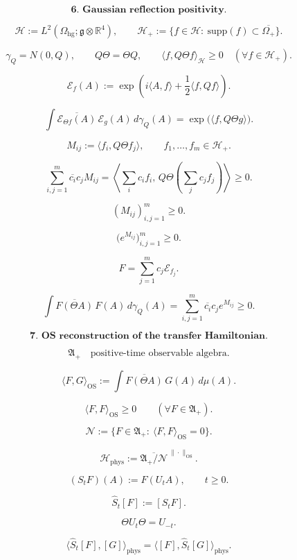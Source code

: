 \documentclass[11pt]{article}
\begin{document}
\bigskip

\[
\textbf{6. Gaussian reflection positivity.}
\]

\[
\mathcal H:=L^2(\Omega_{\mathrm{hg}};\mathfrak g\otimes\mathbb R^4),
\qquad
\mathcal H_+
:=
\{f\in\mathcal H:\ \mathrm{supp}(f)\subset\overline{\Omega_+}\}.
\]

\[
\gamma_Q=N(0,Q),
\qquad
Q\Theta=\Theta Q,
\qquad
\langle f,Q\Theta f\rangle_{\mathcal H}\ge0
\quad
(\forall f\in\mathcal H_+).
\]

\[
\mathcal E_f(A)
:=
\exp\!\left(
i\langle A,f\rangle+\frac12\langle f,Qf\rangle
\right).
\]

\[
\int \overline{\mathcal E_{\Theta f}(A)}\,\mathcal E_g(A)\,d\gamma_Q(A)
=
\exp\!\bigl(\langle f,Q\Theta g\rangle\bigr).
\]

\[
M_{ij}:=\langle f_i,Q\Theta f_j\rangle,
\qquad
f_1,\dots,f_m\in\mathcal H_+.
\]

\[
\sum_{i,j=1}^m\overline{c_i}c_jM_{ij}
=
\left\langle
\sum_i c_if_i,\,
Q\Theta\left(\sum_j c_jf_j\right)
\right\rangle
\ge0.
\]

\[
(M_{ij})_{i,j=1}^m\ge0.
\]

\[
\bigl(e^{M_{ij}}\bigr)_{i,j=1}^m\ge0.
\]

\[
F=\sum_{j=1}^m c_j\mathcal E_{f_j}.
\]

\[
\int \overline{F(\Theta A)}\,F(A)\,d\gamma_Q(A)
=
\sum_{i,j=1}^m\overline{c_i}c_j e^{M_{ij}}
\ge0.
\]

\bigskip

\[
\textbf{7. OS reconstruction of the transfer Hamiltonian.}
\]

\[
\mathfrak A_+
\quad
\text{positive-time observable algebra}.
\]

\[
\langle F,G\rangle_{\mathrm{OS}}
:=
\int \overline{F(\Theta A)}\,G(A)\,d\mu(A).
\]

\[
\langle F,F\rangle_{\mathrm{OS}}\ge0
\qquad
(\forall F\in\mathfrak A_+).
\]

\[
\mathcal N
:=
\{F\in\mathfrak A_+:\ \langle F,F\rangle_{\mathrm{OS}}=0\}.
\]

\[
\mathcal H_{\mathrm{phys}}
:=
\overline{\mathfrak A_+/\mathcal N}^{\ \|\cdot\|_{\mathrm{OS}}}.
\]

\[
(S_tF)(A):=F(U_tA),
\qquad
t\ge0.
\]

\[
\widehat S_t[F]:=[S_tF].
\]

\[
\Theta U_t\Theta=U_{-t}.
\]

\[
\langle \widehat S_t[F],[G]\rangle_{\mathrm{phys}}
=
\langle [F],\widehat S_t[G]\rangle_{\mathrm{phys}}.
\]
\end{document}
